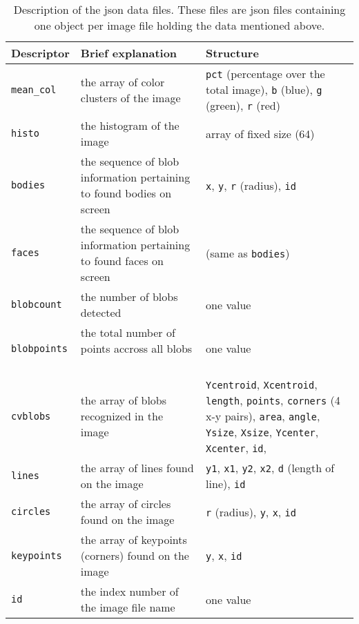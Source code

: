 \begin{table}
\begin{tabular}{ l | p{6cm} |   p{6cm} }

Descriptor & Brief explanation & Structure

\tabularnewline
\hline

\texttt{mean\_col}  & the array of color clusters of the image \
& 
\texttt{pct} (percentage over the total image), 
\texttt{b} (blue), 
\texttt{g} (green), 
\texttt{r} (red)

\tabularnewline
\hline

\texttt{histo}      & the histogram of the image \
& array of fixed size (64)

\tabularnewline
\hline

\texttt{bodies}     & the sequence of blob information pertaining to found bodies on screen \
& 
\texttt{x}, 
\texttt{y}, 
\texttt{r} (radius), 
\texttt{id}

\tabularnewline
\hline

\texttt{faces}      & the sequence of blob information pertaining to found faces on screen \
& (same as \texttt{bodies})

\tabularnewline
\hline

\texttt{blobcount}  & the number of blobs detected \
& one value

\tabularnewline
\hline

\texttt{blobpoints} & the total number of points accross all blobs \
& one value

\tabularnewline
\hline

\texttt{cvblobs}    & the array of blobs recognized in the image \ 
& 
\texttt{Ycentroid}, 
\texttt{Xcentroid}, 
\texttt{length}, 
\texttt{points}, 
\texttt{corners} (4 x-y pairs), 
\texttt{area}, 
\texttt{angle}, 
\texttt{Ysize}, 
\texttt{Xsize}, 
\texttt{Ycenter}, 
\texttt{Xcenter}, 
\texttt{id}, 

\tabularnewline
\hline

\texttt{lines}      & the array of lines found on the image \
& 
\texttt{y1}, 
\texttt{x1},
\texttt{y2}, 
\texttt{x2}, 
\texttt{d} (length of line), 
\texttt{id}

\tabularnewline
\hline

\texttt{circles}    & the array of circles found on the image \
&
\texttt{r} (radius), 
\texttt{y}, 
\texttt{x}, 
\texttt{id}

\tabularnewline
\hline

\texttt{keypoints}  & the array of keypoints (corners) found on the image \
& 
\texttt{y},  
\texttt{x}, 
\texttt{id} 

\tabularnewline
\hline

\texttt{id}  & the index number of the image file name \
& one value


\end{tabular}
\caption{Description of the \gls{json} data files. These files are \gls{json} files containing one object per image file holding the data mentioned above. }
\label{tab:jsondatafiles}
\end{table}



